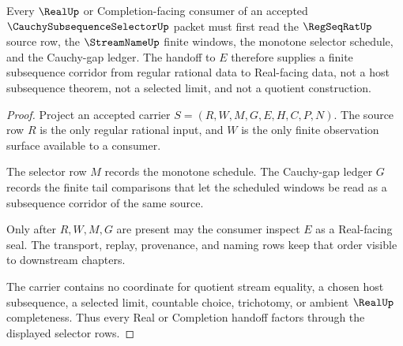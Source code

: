 \begin{theorem}
\label{thm:cauchy-subsequence-selector-real-handoff}
Every $\RealUp$ or Completion-facing consumer of an accepted $\CauchySubsequenceSelectorUp$ packet must first read the $\RegSeqRatUp$ source row, the $\StreamNameUp$ finite windows, the monotone selector schedule, and the Cauchy-gap ledger. The handoff to $E$ therefore supplies a finite subsequence corridor from regular rational data to Real-facing data, not a host subsequence theorem, not a selected limit, and not a quotient construction.
\end{theorem}
\begin{proof}
Project an accepted carrier $S=(R,W,M,G,E,H,C,P,N)$. The source row $R$ is the only regular rational input, and $W$ is the only finite observation surface available to a consumer.

The selector row $M$ records the monotone schedule. The Cauchy-gap ledger $G$ records the finite tail comparisons that let the scheduled windows be read as a subsequence corridor of the same source.

Only after $R,W,M,G$ are present may the consumer inspect $E$ as a Real-facing seal. The transport, replay, provenance, and naming rows keep that order visible to downstream chapters.

The carrier contains no coordinate for quotient stream equality, a chosen host subsequence, a selected limit, countable choice, trichotomy, or ambient $\RealUp$ completeness. Thus every Real or Completion handoff factors through the displayed selector rows.
\end{proof}

